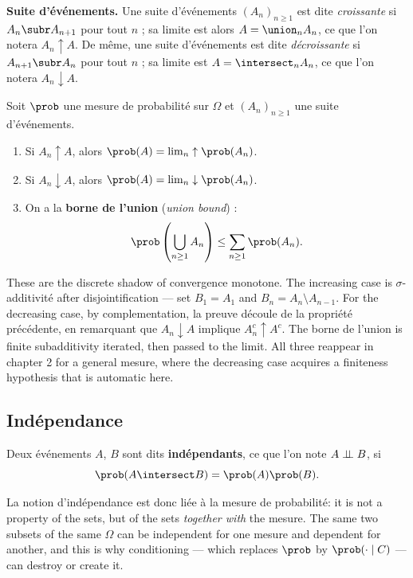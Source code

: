 \textbf{Suite d'événements.} Une suite d'événements $(A_{n})_{n \ge 1}$ est dite
\emph{croissante} si $A_{n} \subr A_{n+1}$ pour tout $n$ ; sa limite est alors
$A = \union_{n} A_{n}$, ce que l'on notera $A_{n} \uparrow A$. De même, une suite
d'événements est dite \emph{décroissante} si $A_{n+1} \subr A_{n}$ pour tout
$n$ ; sa limite est $A = \intersect_{n} A_{n}$, ce que l'on notera
$A_{n} \downarrow A$.

\begin{prop}
  Soit $\prob$ une mesure de probabilité sur $\Omega$ et $(A_{n})_{n \ge 1}$ une
  suite d'événements.
  \begin{enumerate}
    \item Si $A_{n} \uparrow A$, alors $\prob(A) = \lim_{n} \uparrow \prob(A_{n})$.
    \item Si $A_{n} \downarrow A$, alors
      $\prob(A) = \lim_{n} \downarrow \prob(A_{n})$.
    \item On a la \textbf{borne de l'union} (\textit{union bound}) :
      \[ \prob\left( \bigcup_{n \ge 1} A_{n} \right)
           \le \sum_{n \ge 1} \prob(A_{n}). \]
  \end{enumerate}
\end{prop}

\begin{remark}
  These are the discrete shadow of convergence monotone. The increasing case is
  $\sigma$-additivité after disjointification --- set $B_{1} = A_{1}$ and
  $B_{n} = A_{n} \setminus A_{n-1}$. For the decreasing case, by
  complementation, la preuve découle de la propriété précédente, en remarquant
  que $A_{n} \downarrow A$ implique $A_{n}^{c} \uparrow A^{c}$.
  The borne de l'union is finite subadditivity iterated, then passed to the
  limit. All three reappear in chapter 2 for a general mesure, where the
  decreasing case acquires a finiteness hypothesis that is automatic here.
\end{remark}

\subsection{Indépendance}

\begin{definition}
  Deux événements $A$, $B$ sont dits \textbf{indépendants}, ce que l'on note
  $A \perp\!\!\!\perp B$, si
  \[ \prob(A \intersect B) = \prob(A)\prob(B). \]
\end{definition}

La notion d'indépendance est donc liée à la mesure de probabilité: it is not a
property of the sets, but of the sets \emph{together with} the mesure. The same
two subsets of the same $\Omega$ can be independent for one mesure and dependent
for another, and this is why conditioning --- which replaces $\prob$ by
$\prob(\cdot \mid C)$ --- can destroy or create it.

